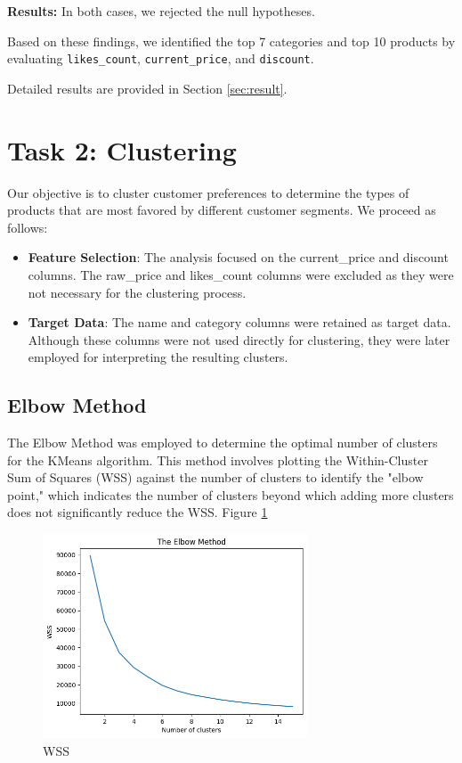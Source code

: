 \documentclass[a4paper,11pt]{article}
\begin{document}
\textbf{Results:} In both cases, we rejected the null hypotheses.

Based on these findings, we identified the top 7 categories and top 10 products by evaluating \texttt{likes\_count}, \texttt{current\_price}, and \texttt{discount}.

Detailed results are provided in Section \ref{sec:result}.


\section{Task 2: Clustering}

Our objective is to cluster customer preferences to determine the types of products that are most favored by different customer segments. We proceed as follows:

\begin{itemize}
\item \textbf{Feature Selection}: The analysis focused on the current\_price and discount columns. The raw\_price and likes\_count columns were excluded as they were not necessary for the clustering process.
\item \textbf{Target Data}: The name and category columns were retained as target data. Although these columns were not used directly for clustering, they were later employed for interpreting the resulting clusters.
\end{itemize}


\subsection{Elbow Method}

The Elbow Method was employed to determine the optimal number of clusters for the KMeans algorithm. This method involves plotting the Within-Cluster Sum of Squares (WSS) against the number of clusters to identify the "elbow point," which indicates the number of clusters beyond which adding more clusters does not significantly reduce the WSS. Figure \ref{fig:wss}

\begin{figure}[h!]
    \centering
    \includegraphics[width=0.7\textwidth]{wss.png}
    \caption{WSS}
    \label{fig:wss}
\end{figure}
\end{document}
